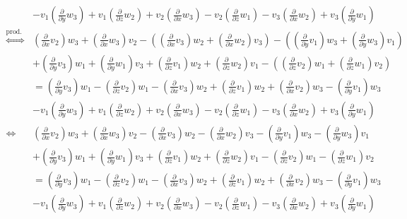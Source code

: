 \documentclass[10pt,a4paper,parskip=half]{scrartcl}
\begin{document}
\begin{align*}
 &- v_1\left(\frac{\partial }{\partial y}w_3\right) + v_1\left(\frac{\partial }{\partial z}w_2\right) + v_2\left(\frac{\partial }{\partial x}w_3\right ) - v_2\left(\frac{\partial }{\partial z}w_1\right) - v_3\left(\frac{\partial }{\partial x}w_2\right) + v_3\left(\frac{\partial }{\partial y}w_1\right) \\
\stackrel{\text{prod. R.}}{\Leftrightarrow}\; &\left(\frac{\partial }{\partial x}v_2\right)w_3 +  \left(\frac{\partial }{\partial x}w_3\right)v_2 - \left(\left(\frac{\partial }{\partial x}v_3\right)w_2 + \left(\frac{\partial }{\partial x}w_2\right)v_3\right)  - \left(\left(\frac{\partial }{\partial y}v_1\right)w_3 + \left(\frac{\partial }{\partial y}w_3\right)v_1\right) \\
& + \left(\frac{\partial }{\partial y}v_3\right)w_1 + \left(\frac{\partial }{\partial y}w_1\right)v_3 + \left(\frac{\partial }{\partial z}v_1\right)w_2 + \left(\frac{\partial }{\partial z}w_2\right)v_1 - \left( \left(\frac{\partial }{\partial z}v_2\right)w_1 + \left(\frac{\partial }{\partial z}w_1\right)v_2 \right)\\
&= \left(\frac{\partial }{\partial y}v_3\right)w_1 - \left(\frac{\partial }{\partial z}v_2\right)w_1 - \left(\frac{\partial }{\partial x}v_3\right)w_2 + \left(\frac{\partial }{\partial z}v_1\right)w_2 + \left(\frac{\partial }{\partial x}v_2\right)w_3 - \left(\frac{\partial }{\partial y}v_1\right)w_3\\
 &- v_1\left(\frac{\partial }{\partial y}w_3\right) + v_1\left(\frac{\partial }{\partial z}w_2\right) + v_2\left(\frac{\partial }{\partial x}w_3\right ) - v_2\left(\frac{\partial }{\partial z}w_1\right) - v_3\left(\frac{\partial }{\partial x}w_2\right) + v_3\left(\frac{\partial }{\partial y}w_1\right) \\
\Leftrightarrow\; &\left(\frac{\partial }{\partial x}v_2\right)w_3 +  \left(\frac{\partial }{\partial x}w_3\right)v_2 - \left(\frac{\partial }{\partial x}v_3\right)w_2 - \left(\frac{\partial }{\partial x}w_2\right)v_3 - \left(\frac{\partial }{\partial y}v_1\right)w_3 - \left(\frac{\partial }{\partial y}w_3\right)v_1 \\
& + \left(\frac{\partial }{\partial y}v_3\right)w_1 + \left(\frac{\partial }{\partial y}w_1\right)v_3 + \left(\frac{\partial }{\partial z}v_1\right)w_2 + \left(\frac{\partial }{\partial z}w_2\right)v_1 - \left(\frac{\partial }{\partial z}v_2\right)w_1 - \left(\frac{\partial }{\partial z}w_1\right)v_2\\
&= \left(\frac{\partial }{\partial y}v_3\right)w_1 - \left(\frac{\partial }{\partial z}v_2\right)w_1 - \left(\frac{\partial }{\partial x}v_3\right)w_2 + \left(\frac{\partial }{\partial z}v_1\right)w_2 + \left(\frac{\partial }{\partial x}v_2\right)w_3 - \left(\frac{\partial }{\partial y}v_1\right)w_3\\
 &- v_1\left(\frac{\partial }{\partial y}w_3\right) + v_1\left(\frac{\partial }{\partial z}w_2\right) + v_2\left(\frac{\partial }{\partial x}w_3\right ) - v_2\left(\frac{\partial }{\partial z}w_1\right) - v_3\left(\frac{\partial }{\partial x}w_2\right) + v_3\left(\frac{\partial }{\partial y}w_1\right) \\
\end{align*}
\end{document}

